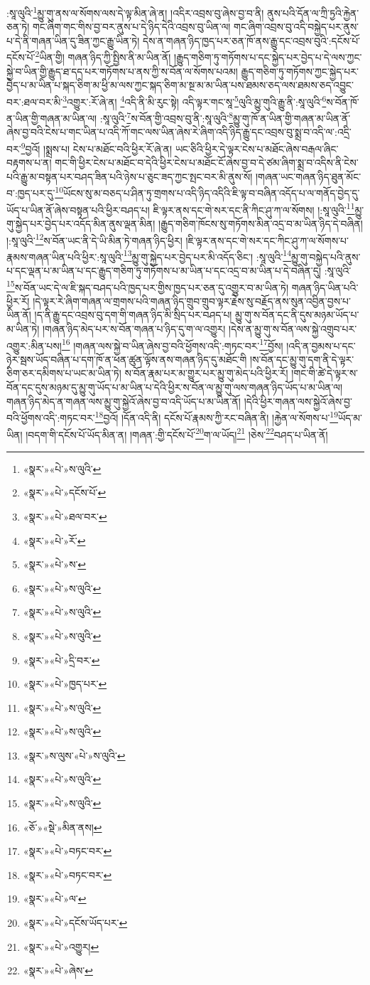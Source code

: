 :སཱ་ལུའི་\footnote{«སྣར་»«པེ་»ས་ལུའི་}མྱུ་གུ་ནས་ལ་སོགས་ལས་དེ་ལྟ་མིན་ཞེ་ན། །འདིར་འབྲས་བུ་ཞེས་བྱ་བ་ནི། ནུས་པའི་དོན་ལ་ཀྲི་ཏྱའི་རྐྱེན་ཅན་ཏེ། གང་ཞིག་གང་གིས་བྱ་བར་ནུས་པ་དེ་ཉིད་དེའི་འབྲས་བུ་ཡིན་ལ། གང་ཞིག་འབྲས་བུ་འདི་བསྐྱེད་པར་ནུས་པ་དེ་ནི་གཞན་ཡིན་དུ་ཟིན་ཀྱང་རྒྱུ་ཡིན་ཏེ། དེས་ན་གཞན་ཉིད་ཁྱད་པར་ཅན་ཁོ་ནས་རྒྱུ་དང་འབྲས་བུའི་:དངོས་པོ་དངོས་པོ་\footnote{«སྣར་»«པེ་»དངོས་པོ་}ཡིན་གྱི། གཞན་ཉིད་ཀྱི་སྤྱིས་ནི་མ་ཡིན་ནོ། །རྒྱུད་གཅིག་ཏུ་གཏོགས་པ་དང་སྐྱེད་པར་བྱེད་པ་དེ་ལས་ཀྱང་སྐྱེ་བ་ཡིན་གྱི་རྒྱུད་ཐ་དད་པར་གཏོགས་པ་ནས་ཀྱི་ས་བོན་ལ་སོགས་པའམ། རྒྱུད་གཅིག་ཏུ་གཏོགས་ཀྱང་སྐྱེད་པར་བྱེད་པ་མ་ཡིན་པ་སྐད་ཅིག་མ་ཕྱི་མ་ལས་ཀྱང་སྐད་ཅིག་མ་སྔ་མ་མ་ཡིན་པས་ཐམས་ཅད་ལས་ཐམས་ཅད་འབྱུང་བར་:ཐལ་བར་མི་\footnote{«སྣར་»«པེ་»ཐལ་བར་}འགྱུར་:རོ་ཞེ་ན། \footnote{«སྣར་»«པེ་»རོ་}འདི་ནི་མི་རུང་སྟེ། འདི་ལྟར་གང་སཱ་\footnote{«སྣར་»«པེ་»ས་}ལུའི་མྱུ་གུའི་རྒྱུ་ནི་:སཱ་ལུའི་\footnote{«སྣར་»«པེ་»ས་ལུའི་}ས་བོན་ཁོ་ན་ཡིན་གྱི་གཞན་མ་ཡིན་ལ། :སཱ་ལུའི་\footnote{«སྣར་»«པེ་»ས་ལུའི་}ས་བོན་གྱི་འབྲས་བུ་ནི་:སཱ་ལུའི་\footnote{«སྣར་»«པེ་»ས་ལུའི་}མྱུ་གུ་ཁོ་ན་ཡིན་གྱི་གཞན་མ་ཡིན་ནོ་ཞེས་བྱ་བའི་ངེས་པ་གང་ཡིན་པ་འདི་ཀོ་གང་ལས་ཡིན་ཞེས་རེ་ཞིག་འདི་ཉིད་རྒྱུ་དང་འབྲས་བུ་སྨྲ་བ་འདི་ལ་:འདྲི་བར་\footnote{«སྣར་»«པེ་»དྲི་བར་}བྱའོ། །སྨྲས་པ། ངེས་པ་མཐོང་བའི་ཕྱིར་རོ་ཞེ་ན། ཡང་ཅིའི་ཕྱིར་དེ་ལྟར་ངེས་པ་མཐོང་ཞེས་བརྒལ་ཞིང་བརྟགས་པ་ན། གང་གི་ཕྱིར་ངེས་པ་མཐོང་བ་དེའི་ཕྱིར་ངེས་པ་མཐོང་ངོ་ཞེས་བྱ་བ་དེ་ཙམ་ཞིག་སྨྲ་བ་འདིས་ནི་ངེས་པའི་རྒྱུ་མ་བསྟན་པར་བཤད་ཟིན་པའི་ཉེས་པ་ཅུང་ཟད་ཀྱང་སྤང་བར་མི་ནུས་སོ། །གཞན་ཡང་གཞན་ཉིད་ཐུན་མོང་བ་:ཁྱད་པར་དུ་\footnote{«སྣར་»«པེ་»ཁྱད་པར་}ཡོངས་སུ་མ་བཅད་པ་ཤིན་ཏུ་གྲགས་པ་འདི་ཉིད་འདིའི་ཇི་ལྟ་བ་བཞིན་འདོད་པ་ལ་གནོད་བྱེད་དུ་ཡོད་པ་ཡིན་ནོ་ཞེས་བསྟན་པའི་ཕྱིར་བཤད་པ། ཇི་ལྟར་ནས་དང་གེ་སར་དང་ནི་ཀིང་ཤུ་ཀ་ལ་སོགས། །:སཱ་ལུའི་\footnote{«སྣར་»«པེ་»ས་ལུའི་}མྱུ་གུ་སྐྱེད་པར་བྱེད་པར་འདོད་མིན་ནུས་ལྡན་མིན། །རྒྱུད་གཅིག་ཁོངས་སུ་གཏོགས་མིན་འདྲ་བ་མ་ཡིན་ཉིད་དེ་བཞིན། །:སཱ་ལུའི་\footnote{«སྣར་»«པེ་»ས་ལུའི་}ས་བོན་ཡང་ནི་དེ་ཡི་མིན་ཏེ་གཞན་ཉིད་ཕྱིར། །ཇི་ལྟར་ནས་དང་གེ་སར་དང་ཀིང་ཤུ་ཀ་ལ་སོགས་པ་རྣམས་གཞན་ཡིན་པའི་ཕྱིར་:སཱ་ལུའི་\footnote{«སྣར་»ས་ལུས་«པེ་»ས་ལུའི་}མྱུ་གུ་སྐྱེད་པར་བྱེད་པར་མི་འདོད་ཅིང་། :སཱ་ལུའི་\footnote{«སྣར་»«པེ་»ས་ལུའི་}མྱུ་གུ་བསྐྱེད་པའི་ནུས་པ་དང་ལྡན་པ་མ་ཡིན་པ་དང་རྒྱུད་གཅིག་ཏུ་གཏོགས་པ་མ་ཡིན་པ་དང་འདྲ་བ་མ་ཡིན་པ་དེ་བཞིན་དུ། :སཱ་ལུའི་\footnote{«སྣར་»«པེ་»ས་ལུའི་}ས་བོན་ཡང་དེ་ལ་ཇི་སྐད་བཤད་པའི་ཁྱད་པར་གྱིས་ཁྱད་པར་ཅན་དུ་འགྱུར་བ་མ་ཡིན་ཏེ། གཞན་ཉིད་ཡིན་པའི་ཕྱིར་རོ། །དེ་ལྟར་རེ་ཞིག་གཞན་ལ་གྲགས་པའི་གཞན་ཉིད་གྲུབ་གྲུབ་ལྟར་རྗེས་སུ་བརྗོད་ནས་སུན་འབྱིན་བྱས་པ་ཡིན་ནོ། །ད་ནི་རྒྱུ་དང་འབྲས་བུ་དག་གི་གཞན་ཉིད་མི་སྲིད་པར་བཤད་པ། མྱུ་གུ་ས་བོན་དང་ནི་དུས་མཉམ་ཡོད་པ་མ་ཡིན་ཏེ། །གཞན་ཉིད་མེད་པར་ས་བོན་གཞན་པ་ཉིད་དུ་ག་ལ་འགྱུར། །དེས་ན་མྱུ་གུ་ས་བོན་ལས་སྐྱེ་འགྲུབ་པར་འགྱུར་:མིན་པས།\footnote{«ཅོ་»«སྡེ་»མིན་ནས།} །གཞན་ལས་སྐྱེ་བ་ཡིན་ཞེས་བྱ་བའི་ཕྱོགས་འདི་:གཏང་བར་\footnote{«སྣར་»«པེ་»བཏང་བར་}བྱོས། །འདི་ན་བྱམས་པ་དང་ཉེར་སྦས་ཡོད་བཞིན་པ་དག་ཁོ་ན་ཕན་ཚུན་ལྟོས་ནས་གཞན་ཉིད་དུ་མཐོང་གི །ས་བོན་དང་མྱུ་གུ་དག་ནི་དེ་ལྟར་ཅིག་ཅར་དམིགས་པ་ཡང་མ་ཡིན་ཏེ། ས་བོན་རྣམ་པར་མ་གྱུར་པར་མྱུ་གུ་མེད་པའི་ཕྱིར་རོ། །གང་གི་ཚེ་དེ་ལྟར་ས་བོན་དང་དུས་མཉམ་དུ་མྱུ་གུ་ཡོད་པ་མ་ཡིན་པ་དེའི་ཕྱིར་ས་བོན་ལ་མྱུ་གུ་ལས་གཞན་ཉིད་ཡོད་པ་མ་ཡིན་ལ། གཞན་ཉིད་མེད་ན་གཞན་ལས་མྱུ་གུ་སྐྱེའོ་ཞེས་བྱ་བ་འདི་ཡོད་པ་མ་ཡིན་ནོ། །དེའི་ཕྱིར་གཞན་ལས་སྐྱེའོ་ཞེས་བྱ་བའི་ཕྱོགས་འདི་:གཏང་བར་\footnote{«སྣར་»«པེ་»བཏང་བར་}བྱའོ། །དོན་འདི་ནི། དངོས་པོ་རྣམས་ཀྱི་རང་བཞིན་ནི། །རྐྱེན་ལ་སོགས་པ་\footnote{«སྣར་»«པེ་»ལ་}ཡོད་མ་ཡིན། །བདག་གི་དངོས་པོ་ཡོད་མིན་ན། །གཞན་:གྱི་དངོས་པོ་\footnote{«སྣར་»«པེ་»དངོས་ཡོད་པར་}ག་ལ་ཡོད།\footnote{«སྣར་»«པེ་»འགྱུར།} །ཅེས་\footnote{«སྣར་»«པེ་»ཞེས་}བཤད་པ་ཡིན་ནོ། 